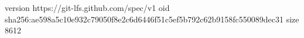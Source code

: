 version https://git-lfs.github.com/spec/v1
oid sha256:ae598a5c10e932c79050f8e2c6d6446f51c5ef5b792c62b9158fc550089dec31
size 8612
